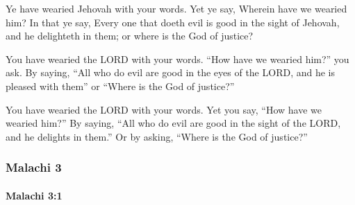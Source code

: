 			\begin{versebox}
					\item[BHS] 
					\item[LXX] 
					\item[ASV] Ye have wearied Jehovah with your words. Yet ye say, Wherein have we wearied him? In that ye say, Every one that doeth evil is good in the sight of Jehovah, and he delighteth in them; or where is the God of justice?
					\item[NIV] You have wearied the LORD with your words. “How have we wearied him?” you ask. By saying, “All who do evil are good in the eyes of the LORD, and he is pleased with them” or “Where is the God of justice?”
					\item[NRSV] You have wearied the LORD with your words. Yet you say, “How have we wearied him?” By saying, “All who do evil are good in the sight of the LORD, and he delights in them.” Or by asking, “Where is the God of justice?”
			\end{versebox}

	\subsubsection{Malachi 3} %
		\label{MALACHI-3}

		\paragraph{Malachi 3:1} %
			\label{MALACHI-3-1}

